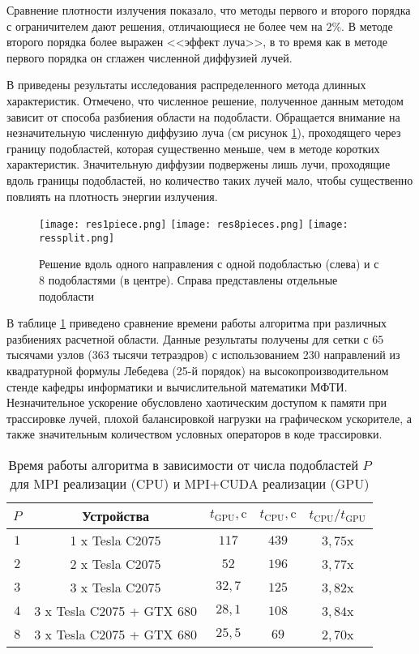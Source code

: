 Сравнение плотности излучения показало, что методы первого и второго порядка с ограничителем дают решения, отличающиеся не более чем на $2\%$. В методе второго порядка более выражен <<эффект луча>>, в то время как в методе первого порядка он сглажен численной диффузией лучей.

В  приведены результаты исследования распределенного метода длинных характеристик. Отмечено, что численное решение, полученное данным методом зависит от способа разбиения области на подобласти. Обращается внимание на незначительную численную диффузию луча (см рисунок \ref{fig:1vs8}), проходящего через границу подобластей, которая существенно меньше, чем в методе коротких характеристик. Значительную диффузии подвержены лишь лучи, проходящие вдоль границы подобластей, но количество таких лучей мало, чтобы существенно повлиять на плотность энергии излучения.
\begin{figure}[ht!]
\centering
\texttt{[image: res1piece.png]} %
\texttt{[image: res8pieces.png]} %
\texttt{[image: ressplit.png]} %
\caption{Решение вдоль одного направления с одной подобластью (слева) и с 8 подобластями (в центре). Справа представлены отдельные подобласти}
\label{fig:1vs8}
\end{figure}

В таблице \ref{tab:speedup} приведено сравнение времени работы алгоритма при различных разбиениях расчетной области. Данные результаты получены для сетки с $65$ тысячами узлов ($363$ тысячи тетраэдров) с использованием 230 направлений из квадратурной формулы Лебедева (25-й порядок) на высокопроизводительном стенде кафедры информатики и вычислительной математики МФТИ. Незначительное ускорение обусловлено хаотическим доступом к памяти при трассировке лучей, плохой балансировкой нагрузки на графическом ускорителе, а также значительным количеством условных операторов в коде трассировки.
\begin{table}[ht!]
\centering
    \begin{tabular}{|c|c|c|c|c|}
    \hline
    $P$ & Устройства & $t_\text{GPU}, \text{c}$ & $t_\text{CPU}, \text{c}$ & $t_\text{CPU} / t_\text{GPU}$\\\hline
    $1$& 1 x Tesla C2075 & $117$ & $439$ & $3,75$x\\\hline
    $2$& 2 x Tesla C2075 & $52$ & $196$ & $3,77$x\\\hline
    $3$& 3 x Tesla C2075 & $32,7$ & $125$ & $3,82$x\\\hline
    $4$& 3 x Tesla C2075 + GTX 680 & $28,1$ & $108$ & $3,84$x\\
	\hline
    $8$& 3 x Tesla C2075 + GTX 680 & $25,5$ & $69$ & $2,70$x\\\hline
    \end{tabular}
\caption{Время работы алгоритма в зависимости от числа подобластей $P$ для MPI реализации (CPU) и MPI+CUDA реализации (GPU)}
\label{tab:speedup}
\end{table}

